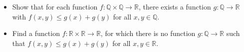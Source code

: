 \begin{itemize}
\item[(a)]  Show that for each function \(f\colon \mathbb{Q} \times \mathbb{Q} \to \mathbb{R}\), there exists a function \(g\colon \mathbb{Q}\to \mathbb{R}\) with \(f(x,y) \leq g(x)+g(y) \) for all \(x,y\in \mathbb{Q}\).
\item[(b)] Find a function \(f\colon \mathbb{R} \times \mathbb{R} \to \mathbb{R}\), for which there is no function \(g\colon \mathbb{Q}\to \mathbb{R}\) such that \(f(x,y) \leq g(x)+g(y) \) for all \(x,y\in \mathbb{R}\).
\end{itemize}
